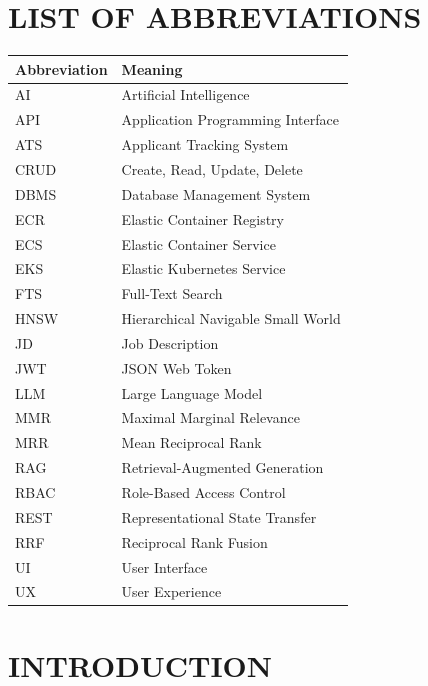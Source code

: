 \documentclass[12pt,a4paper,oneside]{report}
\begin{document}
\chapter*{LIST OF ABBREVIATIONS}
\begin{longtable}{p{3cm}p{11cm}}
\toprule
\textbf{Abbreviation} & \textbf{Meaning}\\
\midrule
AI & Artificial Intelligence\\
API & Application Programming Interface\\
ATS & Applicant Tracking System\\
CRUD & Create, Read, Update, Delete\\
DBMS & Database Management System\\
ECR & Elastic Container Registry\\
ECS & Elastic Container Service\\
EKS & Elastic Kubernetes Service\\
FTS & Full-Text Search\\
HNSW & Hierarchical Navigable Small World\\
JD & Job Description\\
JWT & JSON Web Token\\
LLM & Large Language Model\\
MMR & Maximal Marginal Relevance\\
MRR & Mean Reciprocal Rank\\
RAG & Retrieval-Augmented Generation\\
RBAC & Role-Based Access Control\\
REST & Representational State Transfer\\
RRF & Reciprocal Rank Fusion\\
UI & User Interface\\
UX & User Experience\\
\bottomrule
\end{longtable}

\clearpage
{}

\chapter{INTRODUCTION}
\end{document}
